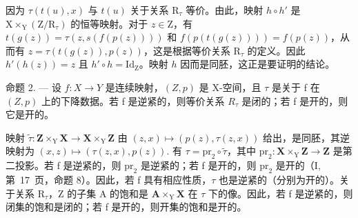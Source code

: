 因为 \(\tau(t(u), x)\) 与 \(t(u)\) 关于关系 \(\mathrm{R}_{\tau}\) 等价。由此，映射 \(h \circ h'\) 是 \(\mathrm{X} \times_{\mathrm{Y}} (\mathrm{Z}/\mathrm{R}_{\tau})\) 的恒等映射。对于 \(z \in \mathrm{Z}\)，有 \(t(g(z)) = \tau(z, s(f(p(z))))\) 和 \(f(p(t(g(z)))) = f(p(z))\)，从而有 \(z = \tau(t(g(z)), p(z))\)，这是根据等价关系 \(\mathrm{R}_{\tau}\) 的定义。因此 \(h'(h(z)) = z\) 且 \(h' \circ h = \mathrm{Id}_{\mathrm{Z}}\)。映射 \(h\) 因而是同胚，这正是要证明的结论。

命题 2. --- 设 \(f\colon X \to Y\) 是连续映射，\((Z,p)\) 是 X-空间，且 \(\tau\) 是关于 f 在 \((Z,p)\) 上的下降数据。若 f 是逆紧的，则等价关系 \(R_{\tau}\) 是闭的；若 f 是开的，则它是开的。

映射 \(\widetilde{\tau}\colon\mathbf{Z}\times_{\mathrm{Y}}\mathbf{X}\to\mathbf{X}\times_{\mathrm{Y}}\mathbf{Z}\) 由 \((z,x)\mapsto(p(z),\tau(z,x))\) 给出，是同胚，其逆映射为 \((x,z)\mapsto(\tau(z,x),p(z)).\) 有 \(\tau=\mathrm{pr}_{2}\circ\widetilde{\tau}\)，其中 \(\mathrm{pr}_{2}\colon\mathbf{X}\times_{\mathrm{Y}}\mathbf{Z}\to\mathbf{Z}\) 是第二投影。若 f 是逆紧的，则 \(\mathrm{pr}_{2}\) 是逆紧的；若 f 是开的，则 \(\mathrm{pr}_{2}\) 是开的（I, 第~17~页，命题 8）。因此，若 f 具有相应性质，\(\tau\) 也是逆紧的（分别为开的）。关于关系 \(\mathrm{R}_{\tau}\)，Z 的子集 A 的饱和是 \(\mathbf{A}\times_{\mathrm{Y}}\mathbf{X}\) 在 \(\tau\) 下的像。因此，若 f 是逆紧的，则闭集的饱和是闭的；若 f 是开的，则开集的饱和是开的。

